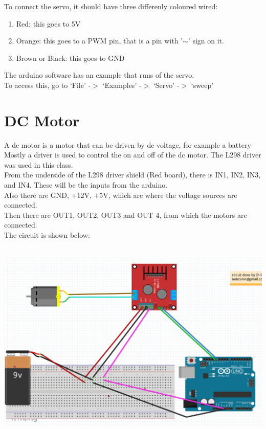 \documentclass[14pt, oneside]{memoir}
\begin{document}
To connect the servo, it should have three differenly coloured
wired:
\begin{enumerate}
    \item Red: this goes to 5V
    \item Orange: this goes to a PWM pin, that is a pin with
        '$\sim$' sign on it.
    \item Brown or Black: this goes to GND
\end{enumerate}

The arduino software has an example that runs of the servo.
\\
To access this, go to `File' -$>$ `Examples' -$>$ `Servo' -$>$
`sweep'
\section*{DC Motor}
A dc motor is a motor that can be driven by dc voltage, for
example a battery
\\
Mostly a driver is used to control the on and off of the dc motor.
The L298 driver was used in this class.
\\
From the underside of the L298 driver shield (Red board), there is
IN1, IN2, IN3, and IN4. These will be the inputs from the arduino.
\\
Also there are GND, +12V, +5V, which are where the voltage sources
are connected.
\\
Then there are OUT1, OUT2, OUT3 and OUT 4, from which the motors
are connected.
\\
The circuit is shown below:

\includegraphics[width=6.49091in,height=3.82013in]{circuit_images/dc_motor_driver.png}
\end{document}
